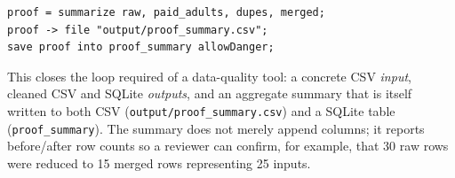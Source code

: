 \begin{lstlisting}[style=dsl]
proof = summarize raw, paid_adults, dupes, merged;
proof -> file "output/proof_summary.csv";
save proof into proof_summary allowDanger;
\end{lstlisting}

This closes the loop required of a data-quality tool: a concrete CSV
\emph{input}, cleaned CSV and SQLite \emph{outputs}, and an aggregate summary
that is itself written to both CSV (\texttt{output/proof\_summary.csv}) and a
SQLite table (\texttt{proof\_summary}). The summary does not merely append
columns; it reports before/after row counts so a reviewer can confirm, for
example, that 30 raw rows were reduced to 15 merged rows representing 25 inputs.

